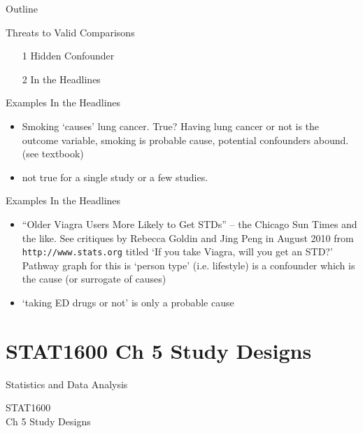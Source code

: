 \documentclass[14pt]{beamer}\usepackage[]{graphicx}\usepackage[]{color}
\begin{document}
\begin{frame}[fragile]{Outline}

Threats to Valid Comparisons  

\begin{itemize}
\item[1] Hidden Confounder
\item[2] In the Headlines
\end{itemize}
\end{frame}

\begin{frame}[fragile]{Examples In the Headlines}

\begin{itemize}
\item<1-> Smoking `causes' lung cancer. True? Having lung cancer or not is  the outcome variable, smoking is probable cause, potential  confounders abound. (see textbook)
\item<2-> not true for a single study or a few studies.
\end{itemize}
\end{frame}

\begin{frame}[fragile]{Examples In the Headlines}

\begin{itemize}
\item<1-> ``Older Viagra Users More Likely to Get STDs'' -- the Chicago Sun  Times and the like. See critiques by Rebecca Goldin and Jing  Peng in August 2010 from  \texttt{http://www.stats.org} titled `If you  take Viagra, will you get an STD?' Pathway graph for this is `person type' (i.e. lifestyle) is a confounder which is the cause (or surrogate of causes)
\item<2-> `taking ED drugs or not' is only a probable cause
\end{itemize}
\end{frame}



\section{STAT1600 Ch 5 Study Designs}

\begin{frame}[fragile]{Statistics and Data Analysis}

STAT1600 \\ Ch 5 Study Designs

\end{frame}
\end{document}
